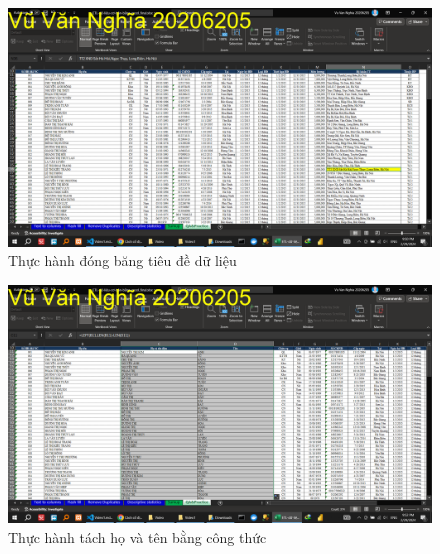 \documentclass{article}
\begin{document}
\begin{figure}[h]
    \centering
    \includegraphics[scale = 0.15]{Video1/ThucHanh/2.png}
    \caption{Thực hành đóng băng tiêu đề dữ liệu}
\end{figure}

\begin{figure}[h]
    \centering
    \includegraphics[scale = 0.15]{Video1/ThucHanh/3.png}
    \caption{Thực hành tách họ và tên bằng công thức}
\end{figure}
\end{document}
